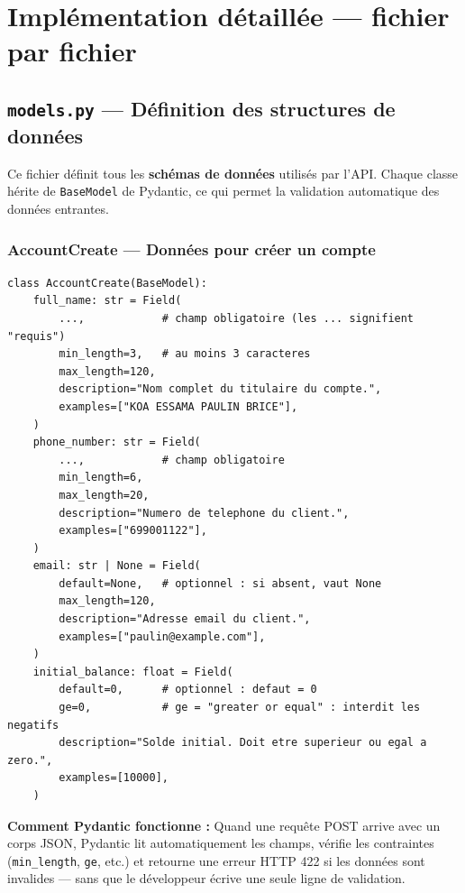 \documentclass[12pt,a4paper]{article}
\begin{document}
\section{Implémentation détaillée — fichier par fichier}

\subsection{\texttt{models.py} — Définition des structures de données}

Ce fichier définit tous les \textbf{schémas de données} utilisés par l'API. Chaque classe hérite de \texttt{BaseModel} de Pydantic, ce qui permet la validation automatique des données entrantes.

\subsubsection{AccountCreate — Données pour créer un compte}

\begin{lstlisting}[style=python, caption={models.py — AccountCreate}]
class AccountCreate(BaseModel):
    full_name: str = Field(
        ...,            # champ obligatoire (les ... signifient "requis")
        min_length=3,   # au moins 3 caracteres
        max_length=120,
        description="Nom complet du titulaire du compte.",
        examples=["KOA ESSAMA PAULIN BRICE"],
    )
    phone_number: str = Field(
        ...,            # champ obligatoire
        min_length=6,
        max_length=20,
        description="Numero de telephone du client.",
        examples=["699001122"],
    )
    email: str | None = Field(
        default=None,   # optionnel : si absent, vaut None
        max_length=120,
        description="Adresse email du client.",
        examples=["paulin@example.com"],
    )
    initial_balance: float = Field(
        default=0,      # optionnel : defaut = 0
        ge=0,           # ge = "greater or equal" : interdit les negatifs
        description="Solde initial. Doit etre superieur ou egal a zero.",
        examples=[10000],
    )
\end{lstlisting}

\begin{infobox}
\textbf{Comment Pydantic fonctionne :} Quand une requête POST arrive avec un corps JSON, Pydantic lit automatiquement les champs, vérifie les contraintes (\texttt{min\_length}, \texttt{ge}, etc.) et retourne une erreur HTTP 422 si les données sont invalides — sans que le développeur écrive une seule ligne de validation.
\end{infobox}
\end{document}
